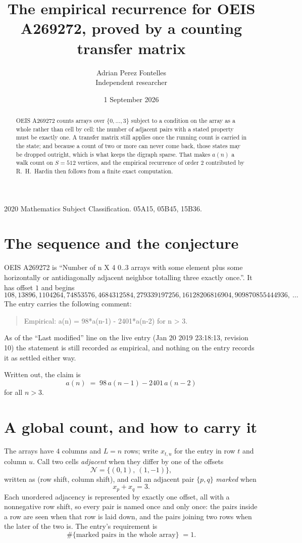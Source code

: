 \documentclass[11pt,a4paper]{article}
\title{The empirical recurrence for OEIS A269272, proved by a counting transfer matrix}
\author{Adrian Perez Fontelles\\ \small Independent researcher}
\date{1 September 2026}
\theoremstyle{plain}
\theoremstyle{definition}
\begin{document}
\maketitle

\begin{abstract}
OEIS A269272 counts arrays over $\{0,\dots,3\}$ subject to a condition on the array as a
whole rather than cell by cell: the number of adjacent pairs with a stated property must be
exactly one. A transfer matrix still applies once the running count is carried in the state; and
because a count of two or more can never come back, those states may be dropped outright,
which is what keeps the digraph sparse. That makes $a(n)$ a walk count on $S=512$ vertices,
and the empirical recurrence of order $2$ contributed by R.~H.~Hardin then follows from
a finite exact computation.
\end{abstract}

\noindent\small 2020 Mathematics Subject Classification. 05A15, 05B45, 15B36.\normalsize

\section{The sequence and the conjecture}

OEIS A269272 is ``Number of n X 4 0..3 arrays with some element plus some horizontally or antidiagonally adjacent neighbor totalling three exactly once.''. It has offset $1$ and begins
\[
108, 13896, 1104264, 74853576, 4684312584, 279339197256, 16128206816904, 909870855444936,\ \dots
\]
The entry carries the following comment:
\begin{quote}\small
Empirical: a(n) = 98*a(n-1) - 2401*a(n-2) for n > 3.
\end{quote}
As of the ``Last modified'' line on the live entry (Jan 20 2019 23:18:13, revision 10) the statement is
still recorded as empirical, and nothing on the entry records it as settled either way.

Written out, the claim is
\begin{equation}\label{eq:conj}
a(n)\;=\;98\,a(n-1) - 2401\,a(n-2)
\end{equation}
for all $n>3$.

\section{A global count, and how to carry it}

The arrays have $4$ columns and $L=n$ rows; write $x_{t,u}$ for the entry in
row $t$ and column $u$. Call two cells \emph{adjacent} when they differ by one of the
offsets
\[
\mathcal N=\{(0,1),\ (1,-1)\},
\]
written as (row shift, column shift), and call an adjacent pair $\{p,q\}$
\emph{marked} when
\[
x_{p}+x_{q}=3 .
\]
Each unordered adjacency is represented by exactly one offset, all with a nonnegative row
shift, so every pair is named once and only once: the pairs inside a row are seen when
that row is laid down, and the pairs joining two rows when the later of the two is. The
entry's requirement is
\begin{equation}\label{eq:glob}
\#\{\text{marked pairs in the whole array}\}\;=1.
\end{equation}
\end{document}
